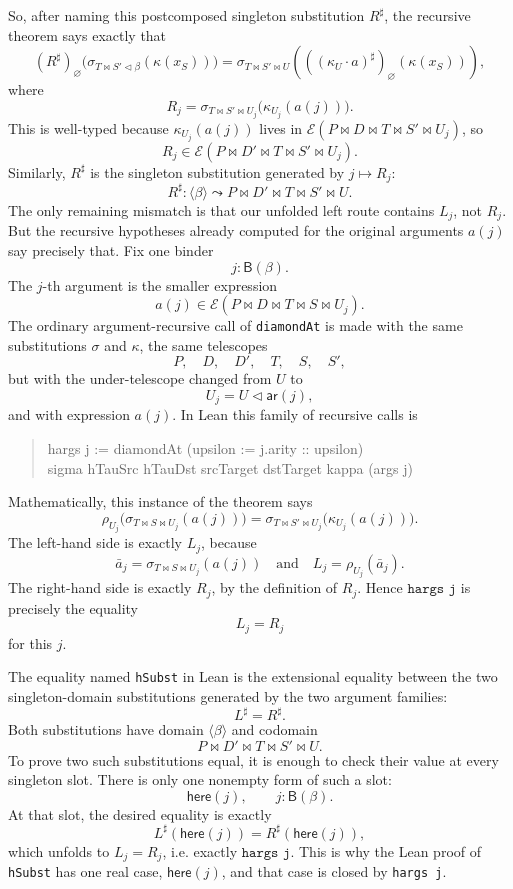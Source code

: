 \documentclass[11pt]{article}
\newcommand{\E}{\mathcal E}
\newcommand{\B}{\mathsf{B}}
\newcommand{\arity}{\mathsf{ar}}
\newcommand{\ext}{\mathbin{\triangleleft}}
\begin{document}
So, after naming this postcomposed singleton substitution \(R^\sharp\), the
recursive theorem says exactly that
\[
  (R^\sharp)_\varnothing
  \bigl(\sigma_{T \bowtie S' \ext \beta}(\kappa(x_S))\bigr)
  =
  \sigma_{T \bowtie S' \bowtie U}
  \left(
    ((\kappa_U \cdot a)^\sharp)_\varnothing(\kappa(x_S))
  \right),
\]
where
\[
  R_j =
  \sigma_{T \bowtie S' \bowtie U_j}
  \bigl(\kappa_{U_j}(a(j))\bigr).
\]
This is well-typed because \(\kappa_{U_j}(a(j))\) lives in
\(\E(P \bowtie D \bowtie T \bowtie S' \bowtie U_j)\), so
\[
  R_j
  \in
  \E(P \bowtie D' \bowtie T \bowtie S' \bowtie U_j).
\]
Similarly, \(R^\sharp\) is the singleton substitution generated by
\(j \mapsto R_j\):
\[
  R^\sharp :
  \langle\beta\rangle
  \leadsto
  P \bowtie D' \bowtie T \bowtie S' \bowtie U.
\]
The only remaining mismatch is that our unfolded left route contains \(L_j\),
not \(R_j\).  But the recursive hypotheses already computed for the original
arguments \(a(j)\) say precisely that.  Fix one binder
\[
  j : \B(\beta).
\]
The \(j\)-th argument is the smaller expression
\[
  a(j) \in \E(P \bowtie D \bowtie T \bowtie S \bowtie U_j).
\]
The ordinary argument-recursive call of \texttt{diamondAt} is made with the
same substitutions \(\sigma\) and \(\kappa\), the same telescopes
\[
  P,\quad D,\quad D',\quad T,\quad S,\quad S',
\]
but with the under-telescope changed from \(U\) to
\[
  U_j = U \ext \arity(j),
\]
and with expression \(a(j)\).  In Lean this family of recursive calls is
\begin{quote}
\small\ttfamily
hargs j := diamondAt (upsilon := j.arity :: upsilon)\\
\hspace*{2em}sigma hTauSrc hTauDst srcTarget dstTarget kappa (args j)
\end{quote}
Mathematically, this instance of the theorem says
\[
  \rho_{U_j}
  \bigl(
    \sigma_{T \bowtie S \bowtie U_j}(a(j))
  \bigr)
  =
  \sigma_{T \bowtie S' \bowtie U_j}
  \bigl(
    \kappa_{U_j}(a(j))
  \bigr).
\]
The left-hand side is exactly \(L_j\), because
\[
  \bar a_j = \sigma_{T \bowtie S \bowtie U_j}(a(j))
  \quad\text{and}\quad
  L_j = \rho_{U_j}(\bar a_j).
\]
The right-hand side is exactly \(R_j\), by the definition of \(R_j\).  Hence
\(\texttt{hargs j}\) is precisely the equality
\[
  L_j = R_j
\]
for this \(j\).

The equality named \texttt{hSubst} in Lean is the extensional equality between
the two singleton-domain substitutions generated by the two argument families:
\[
  L^\sharp = R^\sharp.
\]
Both substitutions have domain \(\langle\beta\rangle\) and codomain
\[
  P \bowtie D' \bowtie T \bowtie S' \bowtie U.
\]
To prove two such substitutions equal, it is enough to check their value at
every singleton slot.  There is only one nonempty form of such a slot:
\[
  \mathsf{here}(j), \qquad j : \B(\beta).
\]
At that slot, the desired equality is exactly
\[
  L^\sharp(\mathsf{here}(j)) = R^\sharp(\mathsf{here}(j)),
\]
which unfolds to \(L_j = R_j\), i.e. exactly \(\texttt{hargs j}\).  This is why
the Lean proof of \texttt{hSubst} has one real case, \(\mathsf{here}(j)\), and
that case is closed by \texttt{hargs j}.
\end{document}
